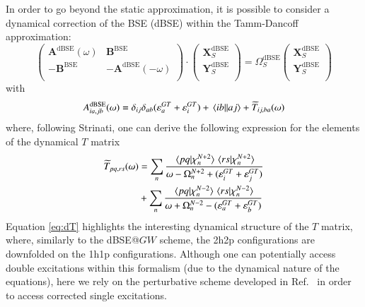 \documentclass[aip,jcp,reprint,noshowkeys,superscriptaddress]{revtex4-1}
\newcommand{\BSE}{\text{BSE}}
\newcommand{\dBSE}{\text{dBSE}}
\newcommand{\GT}{GT}
\newcommand{\e}[2]{\eps_{#1}^{#2}}
\newcommand{\Om}[2]{\Omega_{#1}^{#2}}
\newcommand{\bA}[2]{\mathbf{A}_{#1}^{#2}}
\newcommand{\bB}[2]{\mathbf{B}_{#1}^{#2}}
\newcommand{\bX}[2]{\mathbf{X}_{#1}^{#2}}
\newcommand{\bY}[2]{\mathbf{Y}_{#1}^{#2}}
\newcommand{\eps}{\varepsilon}
\begin{document}
In order to go beyond the static approximation, it is possible to consider a dynamical correction of the BSE (dBSE) within the Tamm-Dancoff approximation:
\begin{equation}
\label{eq:LR-RPA}
	\begin{pmatrix}
		\bA{}{\dBSE}(\omega)	&	\bB{}{\BSE}	\\
		-\bB{}{\BSE}	&	-\bA{}{\dBSE}(-\omega)	\\
	\end{pmatrix}
	\cdot
	\begin{pmatrix}
		\bX{S}{\dBSE}	\\
		\bY{S}{\dBSE}	\\
	\end{pmatrix}
	=
	\Om{S}{\dBSE}
	\begin{pmatrix}
		\bX{S}{\dBSE}	\\
		\bY{S}{\dBSE}	\\
	\end{pmatrix}
\end{equation}
with 
\begin{equation}
	A_{ia,jb}^{\dBSE}(\omega) = \delta_{ij} \delta_{ab} (\e{a}{\GT} + \e{i}{\GT}) + \mel{ib}{}{aj} + \widetilde{T}_{ij,ba}(\omega)
\end{equation}
where, following Strinati, \cite{Strinati_1988} one can derive the following expression for the elements of the dynamical $T$ matrix
\begin{equation}
\label{eq:dT}
\begin{split}
	\widetilde{T}_{pq,rs}(\omega) 
		& = \sum_{n} \frac{\braket*{pq}{\chi_n^{N+2}}\braket*{rs}{\chi_n^{N+2}}}{\omega - \Om{n}{N+2} + (\e{i}{\GT} + \e{j}{\GT})}
		\\
		& + \sum_{n} \frac{\braket*{pq}{\chi_n^{N-2}}\braket*{rs}{\chi_n^{N-2}}}{\omega + \Om{n}{N-2} - (\e{a}{\GT} + \e{b}{\GT})}
\end{split}
\end{equation}
Equation \eqref{eq:dT} highlights the interesting dynamical structure of the $T$ matrix, where, similarly to the dBSE@$GW$ scheme, the 2h2p configurations are downfolded on the 1h1p configurations.
Although one can potentially access double excitations within this formalism (due to the dynamical nature of the equations), here we rely on the perturbative scheme developed in Ref.~ in order to access corrected single excitations.


\end{document}
